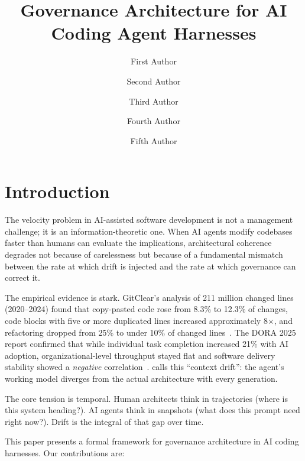 \documentclass[11pt, a4paper, logo, copyright]{googledeepmind}
\title{Governance Architecture for AI Coding Agent Harnesses}
\author[1]{First Author}
\author[2]{Second Author}
\author[2]{Third Author}
\author[1]{Fourth Author}
\author[1]{Fifth Author}
\affil[]{Pragnition Labs}
\affil[*]{Equal Contribution}
\affil[1]{Affiliation 1}
\affil[2]{Affiliation 2}
\begin{document}
\maketitle

\section{Introduction}
\label{sec:intro}

The velocity problem in AI-assisted software development is not a management challenge; it is an information-theoretic one. When AI agents modify codebases faster than humans can evaluate the implications, architectural coherence degrades not because of carelessness but because of a fundamental mismatch between the rate at which drift is injected and the rate at which governance can correct it.

The empirical evidence is stark. GitClear's analysis of 211 million changed lines (2020--2024) found that copy-pasted code rose from 8.3\% to 12.3\% of changes, code blocks with five or more duplicated lines increased approximately 8$\times$, and refactoring dropped from 25\% to under 10\% of changed lines~\citep{gitclear2025}. The DORA 2025 report confirmed that while individual task completion increased 21\% with AI adoption, organizational-level throughput stayed flat and software delivery stability showed a \emph{negative} correlation~\citep{dora2025}. \citet{sylvester2026} calls this ``context drift'': the agent's working model diverges from the actual architecture with every generation.

The core tension is temporal. Human architects think in trajectories (where is this system heading?). AI agents think in snapshots (what does this prompt need right now?). Drift is the integral of that gap over time.

This paper presents a formal framework for governance architecture in AI coding harnesses. Our contributions are:
\end{document}
